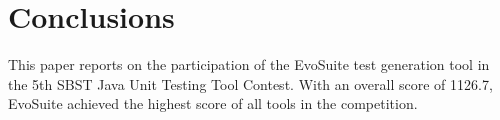 \documentclass[10pt,conference]{IEEEtran}
\newcommand{\EVOSUITE}{{\sc EvoSuite}\xspace}
\begin{document}




\section{Conclusions}

This paper reports on the participation of the \EVOSUITE test
generation tool in the 5th SBST Java Unit Testing Tool Contest. With
an overall score of 1126.7, \EVOSUITE achieved the highest score of
all tools in the competition.
\end{document}
